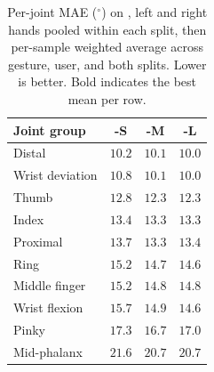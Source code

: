 \begin{table}[h]
\centering
\caption{Per-joint MAE ($^\circ$) on \dataset{}, left and right hands pooled within each split, then per-sample weighted average across gesture, user, and both splits. Lower is better. Bold indicates the best mean per row.}
\label{tab:per_joint_egoemg}
\footnotesize
\setlength{\tabcolsep}{3.5pt}
\renewcommand{\arraystretch}{1.05}
\begin{tabular}{lccc}
\toprule
Joint group & \model{}-S & \model{}-M & \model{}-L \\
\midrule
Distal & $10.2$ & $10.1$ & $\mathbf{10.0}$ \\
Wrist deviation & $10.8$ & $10.1$ & $\mathbf{10.0}$ \\
Thumb & $12.8$ & $\mathbf{12.3}$ & $\mathbf{12.3}$ \\
Index & $13.4$ & $\mathbf{13.3}$ & $13.3$ \\
Proximal & $13.7$ & $\mathbf{13.3}$ & $13.4$ \\
Ring & $15.2$ & $14.7$ & $\mathbf{14.6}$ \\
Middle finger & $15.2$ & $14.8$ & $\mathbf{14.8}$ \\
Wrist flexion & $15.7$ & $14.9$ & $\mathbf{14.6}$ \\
Pinky & $17.3$ & $\mathbf{16.7}$ & $17.0$ \\
Mid-phalanx & $21.6$ & $\mathbf{20.7}$ & $\mathbf{20.7}$ \\
\bottomrule
\end{tabular}
\end{table}